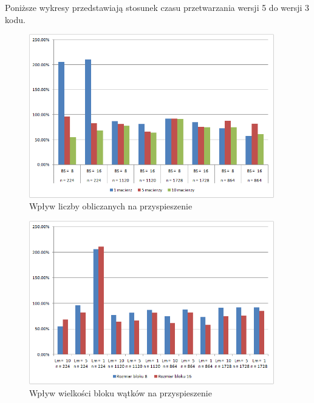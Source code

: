 \documentclass[12pt,a4paper]{article}
\begin{document}
Poniższe wykresy przedstawiają stosunek czasu przetwarzania wersji 5 do wersji 3 kodu.
\begin{figure}[H]
  \centering
    \includegraphics[width=0.95\textwidth]{charts/Lm.png}
    \caption{Wpływ liczby obliczanych na przyspieszenie}
    \label{chart:Lm}
\end{figure}

\begin{figure}[H]
  \centering
    \includegraphics[width=0.95\textwidth]{charts/BS.png}
    \caption{Wpływ wielkości bloku wątków na przyspieszenie}
    \label{chart:BS}
\end{figure}
\end{document}
